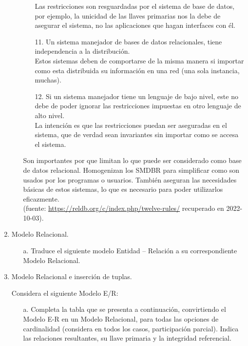 \documentclass[12pt,a4paper]{article}
\begin{document}
\begin{enumerate}
\begin{enumerate}
\begin{enumerate}
						Las restricciones son resguardadas por el sistema de base de datos,
						por ejemplo, la unicidad de las llaves primarias nos la debe
						de asegurar el sistema, no las aplicaciones que hagan interfaces
						con él.\\

					\item[11.] Un sistema manejador de bases de datos relacionales, tiene
						independencia a la distribución.\\

						Estos sistemas deben de comportarse de la misma manera si importar
						como esta distribuida su información en una red (una sola instancia, muchas).\\

					\item[12.] Si un sistema manejador tiene un lenguaje de bajo nivel,
						este no debe de poder ignorar las restricciones impuestas en
						otro lenguaje de alto nivel.\\

						La intención es que las restricciones puedan ser aseguradas
						en el sistema, que de verdad sean invariantes sin importar
						como se accesa el sistema.\\
				\end{enumerate}

				Son importantes por que limitan lo que puede ser considerado como base de datos relacional.
				Homogenizan los SMDBR para simplificar como son usados por los programas o usuarios.
				También aseguran las necesidades básicas de estos sistemas, lo que es necesario
				para poder utilizarlos eficazmente.\\

				(fuente: \url{https://reldb.org/c/index.php/twelve-rules/} recuperado en 2022-10-03).\\
		\end{enumerate}

	\item Modelo Relacional.
		\begin{enumerate}
			\item[a.] Traduce el siguiente modelo Entidad – Relación a su correspondiente Modelo Relacional.
		\end{enumerate}

	\item Modelo Relacional e inserción de tuplas.

		Considera el siguiente Modelo E/R:

		\begin{enumerate}
			\item[a.] Completa la tabla que se presenta a continuación, convirtiendo el Modelo E-R
				en un Modelo Relacional, para todas las opciones de cardinalidad
				(considera en todos los casos, participación parcial).
				Indica las relaciones resultantes, su llave primaria y la integridad referencial.


\end{enumerate}
\end{enumerate}
\end{document}
